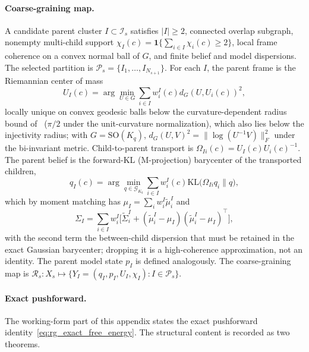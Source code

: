 \documentclass[11pt]{article}
\begin{document}
\paragraph{Coarse-graining map.}
A candidate parent cluster $I \subset \mathcal{I}_s$ satisfies $|I| \ge 2$, connected overlap subgraph, nonempty multi-child support $\chi_I(c) = \mathbf{1}\{\sum_{i \in I}\chi_i(c) \ge 2\}$, local frame coherence on a convex normal ball of $G$, and finite belief and model dispersions. The selected partition is $\mathcal{P}_s = \{I_1, \ldots, I_{N_{s+1}}\}$. For each $I$, the parent frame is the Riemannian center of mass
\begin{equation}
U_I(c) = \arg\min_{U \in G} \sum_{i \in I} w_i^I(c) d_G(U, U_i(c))^2,
\end{equation}
locally unique on convex geodesic balls below the curvature-dependent radius bound of~\cite{Kendall1990, Afsari2011} ($\pi/2$ under the unit-curvature normalization), which also lies below the injectivity radius; with $G = \mathrm{SO}(K_q)$, $d_G(U, V)^2 = \|\log(U^{-1}V)\|_F^2$ under the bi-invariant metric. Child-to-parent transport is $\Omega_{Ii}(c) = U_I(c)U_i(c)^{-1}$. The parent belief is the forward-KL (M-projection) barycenter of the transported children,
\begin{equation}
q_I(c) = \arg\min_{q \in \mathcal{G}_{K_q}} \sum_{i \in I} w_i^I(c) \mathrm{KL}\big(\Omega_{Ii}q_i \| q\big),
\end{equation}
which by moment matching has $\mu_I = \sum_i w_i^I \widetilde{\mu}_i^I$ and
\begin{equation}
\Sigma_I = \sum_{i \in I} w_i^I\big[\widetilde{\Sigma}_i^I + (\widetilde{\mu}_i^I - \mu_I)(\widetilde{\mu}_i^I - \mu_I)^\top\big],
\end{equation}
with the second term the between-child dispersion that must be retained in the exact Gaussian barycenter; dropping it is a high-coherence approximation, not an identity. The parent model state $p_I$ is defined analogously. The coarse-graining map is $\mathcal{R}_s : X_s \mapsto \{Y_I = (q_I, p_I, U_I, \chi_I) : I \in \mathcal{P}_s\}$.

\paragraph{Exact pushforward.}
The working-form part of this appendix states the exact pushforward identity~\eqref{eq:rg_exact_free_energy}. The structural content is recorded as two theorems.
\end{document}
